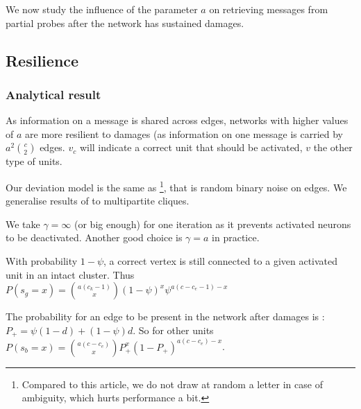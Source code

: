 \documentclass[english,10pt,twocolumn]{IEEEtran}
\theoremstyle{definition}
\begin{document}
		
		
	We now study the influence of the parameter $a$ on retrieving messages from partial probes after the network has sustained damages.
	
	\subsection{Resilience}
	\subsubsection{Analytical result}
	
	As information on a message is shared across edges, networks with higher values of $a$ are more resilient to damages (as information on one message is carried by $a^2 {c \choose 2}$ edges. $v_c$ will indicate a correct unit that should be activated, $v$ the other type of units.
	
	Our deviation model is the same as \cite{LedGriRabGro20145}\footnote{Compared to this article, we do not draw at random a letter in case of ambiguity, which hurts performance a bit.}, that is random binary noise on edges. We generalise results of \cite{LedGriRabGro20145} to multipartite cliques.
	
	We take $\gamma = \infty$ (or big enough) for one iteration as it prevents activated neurons to be deactivated. Another good choice is $\gamma = a$ in practice.
	 
	With probability $1 - \psi$, a correct vertex is still connected to a given activated unit in an intact cluster. Thus $P(s_{g} = x ) = {a (c_k-1) \choose x} (1-\psi)^{x} \psi ^ { a (c - c_e -1) - x }$	
	
	
	The probability for an edge to be present in the network after damages is : $P_+ = \psi (1 - d) + (1 - \psi) d$. So for other units $P(s_b = x) = {a (c - c_e) \choose x} P_+^x (1-P_+)^{a (c - c_e) -x }$.
	
\end{document}
